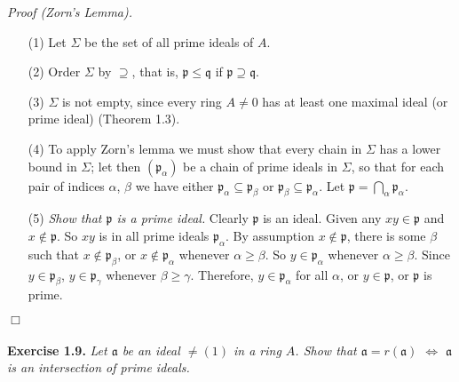 \documentclass{article}
\begin{document}
\emph{Proof (Zorn's Lemma).}
\begin{enumerate}
\item[(1)]
Let $\Sigma$ be the set of all prime ideals of $A$.
\item[(2)]
Order $\Sigma$ by $\supseteq$, that is,
$\mathfrak{p} \leq \mathfrak{q}$ if $\mathfrak{p} \supseteq \mathfrak{q}$.
\item[(3)]
$\Sigma$ is not empty, since every ring $A \neq 0$
has at least one maximal ideal (or prime ideal) (Theorem 1.3).
\item[(4)]
To apply Zorn's lemma we must show that every chain in $\Sigma$ has a lower bound in $\Sigma$;
let then $(\mathfrak{p}_\alpha)$ be a chain of prime ideals in $\Sigma$,
so that for each pair of indices $\alpha$, $\beta$ we have either
$\mathfrak{p}_\alpha \subseteq \mathfrak{p}_\beta$ or
$\mathfrak{p}_\beta \subseteq \mathfrak{p}_\alpha$.
Let $\mathfrak{p} = \bigcap_{\alpha} \mathfrak{p}_\alpha$.
\item[(5)]
\emph{Show that $\mathfrak{p}$ is a prime ideal.}
Clearly $\mathfrak{p}$ is an ideal.
Given any $xy \in \mathfrak{p}$ and $x \not\in \mathfrak{p}$.
So $xy$ is in all prime ideals $\mathfrak{p}_\alpha$.
By assumption $x \not\in \mathfrak{p}$,
there is some $\beta$ such that $x \not\in \mathfrak{p}_\beta$,
or $x \not\in \mathfrak{p}_\alpha$ whenever $\alpha \geq \beta$.
So $y \in \mathfrak{p}_\alpha$ whenever $\alpha \geq \beta$.
Since $y \in \mathfrak{p}_\beta$, $y \in \mathfrak{p}_\gamma$ whenever $\beta \geq \gamma$.
Therefore, $y \in \mathfrak{p}_\alpha$ for all $\alpha$,
or $y \in \mathfrak{p}$,
or $\mathfrak{p}$ is prime.
\end{enumerate}
$\Box$ \\\\






\textbf{Exercise 1.9.}
\emph{Let $\mathfrak{a}$ be an ideal $\neq (1)$ in a ring $A$.
Show that $\mathfrak{a} = r(\mathfrak{a})$ $\Longleftrightarrow$
$\mathfrak{a}$ is an intersection of prime ideals.} \\
\end{document}
